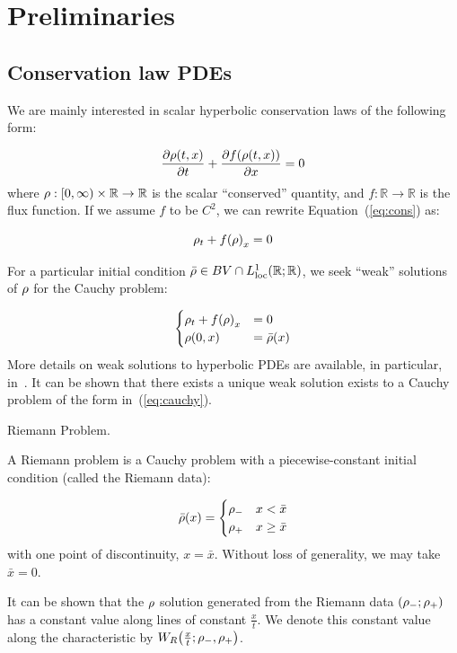 
\section{Preliminaries\label{sec:Preliminaries}}


\subsection{Conservation law PDEs\label{sub:Hyperbolic-PDE's}}

We are mainly interested in scalar hyperbolic conservation laws of
the following form:

\begin{equation}
\pfrac{\cvar\left(t,x\right)}t+\pfrac{f\left(\cvar\left(t,x\right)\right)}x=0\label{eq:cons}
\end{equation}
where $\cvar:\left[0,\infty\right)\times\mathbb{R}\rightarrow\mathbb{R}$
is the scalar ``conserved'' quantity, and $f:\mathbb{R}\rightarrow\mathbb{R}$
is the flux function. If we assume $f$ to be $C^{2}$, we can rewrite
Equation~(\ref{eq:cons}) as:

\begin{equation}
\cvar_{t}+f\left(\cvar\right)_{x}=0\label{eq:cons-smooth}
\end{equation}


For a particular initial condition $\initstate\in BV\cap L_{\text{loc}}^{1}\left(\mathbb{R};\mathbb{R}\right)$,
we seek ``weak'' solutions of $\rho$ for the Cauchy problem:

\begin{equation}
\begin{cases}
\cvar_{t}+f\left(\cvar\right)_{x} & =0\\
\cvar\left(0,x\right) & =\initstate\left(x\right)
\end{cases}\label{eq:cauchy}
\end{equation}
More details on weak solutions to hyperbolic PDEs are available, in
particular, in~\cite{garavello2006traffic,Evans1998}. It can be
shown that there exists a unique weak solution exists to a Cauchy
problem of the form in~(\ref{eq:cauchy}).
\begin{defn}
\label{def:Riemann-Problem}Riemann Problem.

A Riemann problem is a Cauchy problem with a piecewise-constant initial
condition (called the Riemann data):

\[
\initvar{\cvar}\left(x\right)=\begin{cases}
\cvar_{-} & x<\initvar x\\
\cvar_{+} & x\ge\initvar x
\end{cases}
\]
with one point of discontinuity, $x=\bar{x}$. Without loss of generality,
we may take $\bar{x}=0$.
\end{defn}
It can be shown that the $\rho$ solution generated from the Riemann
data $\left(\cvar_{-};\cvar_{+}\right)$ has a constant value along
lines of constant $\frac{x}{t}$. We denote this constant value along
the characteristic by $\ss{\frac{x}{t}}{\cvar_{-}}{\cvar_{+}}$.


